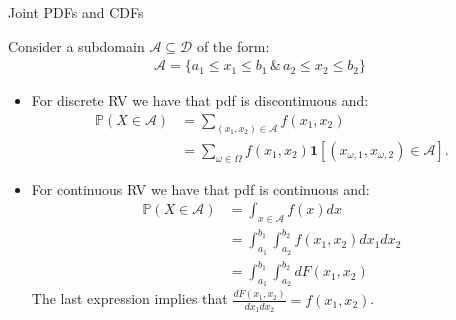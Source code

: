\documentclass[9pt]{beamer}
\begin{document}
%
\begin{frame}{Joint PDFs and CDFs}

Consider a subdomain $\mathcal{A}\subseteq\mathcal{D}$ of the form:
\begin{align*}
\mathcal{A}=\{a_1 \leq x_1\leq b_1 \, \&\, a_2 \leq x_2\leq b_2\}
\end{align*}

\begin{itemize}

\item For discrete RV we have that pdf is discontinuous and:
\begin{align*}
\mathbb{P}(X\in \mathcal{A})&=\sum_{(x_1,x_2)\in \mathcal{A}}f(x_1,x_2)\\
&=\sum_{\omega \in \Omega}f(x_1,x_2)\mathbf{1}[(x_{\omega,1},x_{\omega,2})\in \mathcal{A}].
\end{align*}

\item For continuous RV we have that pdf is continuous and:
\begin{align*}
\mathbb{P}(X\in \mathcal{A})&=\int_{x\in \mathcal{A}}f(x)dx\\
&=\int_{a_1}^{b_1}\int_{a_2}^{b_2}f(x_1,x_2)dx_1dx_2\\
&=\int_{a_1}^{b_1}\int_{a_2}^{b_2}dF(x_1,x_2)
\end{align*}
The last expression implies that $\frac{dF(x_1,x_2)}{dx_1dx_2}=f(x_1,x_2)$.

\end{itemize}

\end{frame}
\end{document}
